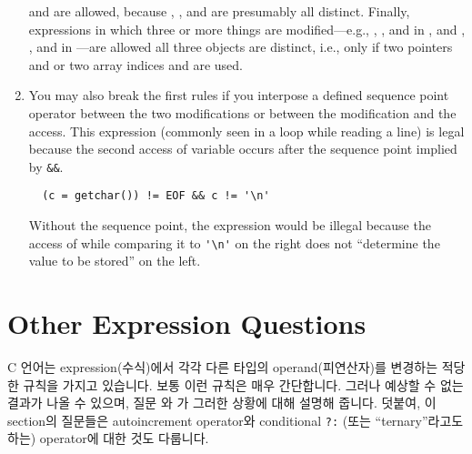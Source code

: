\begin{faq}
\begin{enumerate}
                 and  are allowed, because
                , , and  are presumably all distinct.
                Finally, expressions in which three or more things are
                modified---e.g., , , and  in
                , and , , and  in
                ---are allowed  all three objects
                are distinct, i.e., only if two  pointers 
                and  or two  array indices  and
                 are used.
        \item
                You may also break the first rules if you interpose a
                defined sequence point operator between the two modifications
                or between the modification and the access. This expression
                (commonly seen in a  loop while reading a line)
                is legal because the second access of variable  occurs
                after the sequence point implied by \verb+&&+.
\begin{verbatim}
  (c = getchar()) != EOF && c != '\n'
\end{verbatim}
                Without the sequence point, the expression would be illegal
                because the access of  while comparing it to \verb+'\n'+
                on the right does not ``determine the value to be stored'' on
                the left.
\end{enumerate}
\end{faq}

\section{Other Expression Questions}
C 언어는 expression(수식)에서 각각 다른 타입의 operand(피연산자)를 
변경하는 적당한 규칙을 가지고 있습니다.  보통 이런 규칙은 매우 간단합니다.
그러나 예상할 수 없는 결과가 나올 수 있으며, 질문 와 가
그러한 상황에 대해 설명해 줍니다.
덧붙여, 이 section의 질문들은 autoincrement operator와 conditional
\verb+?:+ (또는 ``ternary''라고도 하는) operator에 대한 것도 다룹니다.


